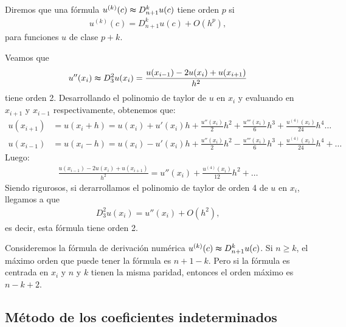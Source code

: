 \begin{defi}
Diremos que una fórmula $u^{(k)}(c) \thickapprox D^k_{n+1}u(c)$ tiene orden $p$ si
\begin{align*}
    u^{(k)}(c) = D^k_{n+1}u(c) + O(h^p),
\end{align*}
para funciones $u$ de clase $p+k$.
\end{defi}

\begin{ejemplo}
Veamos que
\begin{align*}
    u''(x_i) \thickapprox D^2_3u(x_i) = \frac{u(x_{i-1}) - 2u(x_i) +u(x_{i+1})}{h^2}
\end{align*}
tiene orden 2. Desarrollando el polinomio de taylor de $u$ en $x_i$ y evaluando en $x_{i+1}$ y $x_{i-1}$ respectivamente, obtenemos que: 
\begin{align*}
    u(x_{i+1}) &= u(x_i + h) = u(x_i) + u'(x_i)h + \frac{u''(x_i)}{2}h^2 + \frac{u'''(x_i)}{6}h^3 + \frac{u^{(4)}(x_i)}{24}h^4\ldots \\
    u(x_{i-1}) &= u(x_i - h) = u(x_i)- u'(x_i)h + \frac{u''(x_i)}{2}h^2 - \frac{u'''(x_i)}{6}h^3 + \frac{u^{(4)}(x_i)}{24}h^4 + \ldots
\end{align*}
Luego:
\begin{align*}
    \frac{u(x_{i-1}) - 2u(x_i) +u(x_{i+1})}{h^2} = u''(x_i) + \frac{u^{(4)}(x_i)}{12}h^2 + \ldots
\end{align*}
Siendo rigurosos, si derarrollamos el polinomio de taylor de orden 4 de $u$ en $x_i$, llegamos a que
\begin{align*}
    D_3^2u(x_i) = u''(x_i) + O(h^2),
\end{align*}
es decir, esta fórmula tiene orden 2.
\end{ejemplo}

\begin{obs}
Consideremos la fórmula de derivación numérica $u^{(k)}(c) \thickapprox D^k_{n+1}u(c)$. Si $n \ge k$, el máximo orden que puede tener la fórmula es $n+1 -k$. Pero si la fórmula es centrada en $x_i$ y $n$ y $k$ tienen la misma paridad, entonces el orden máximo es $n-k+2$.
\end{obs}

\subsection{Método de los coeficientes indeterminados}

